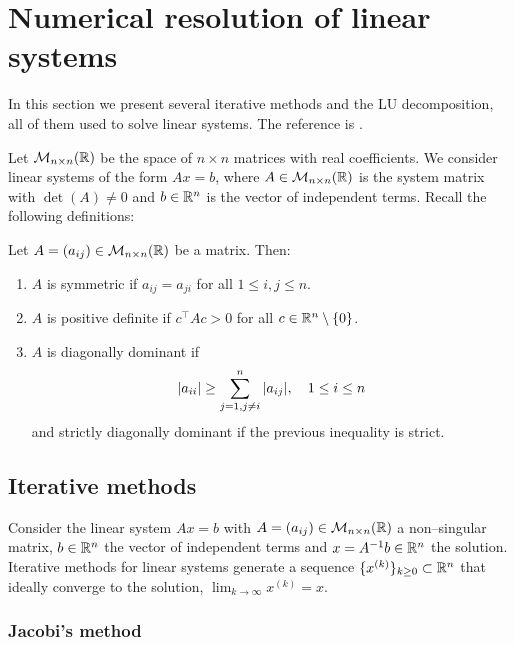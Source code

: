 
\section{Numerical resolution of linear systems} \label{ap:numerical_resolution_linear_systems}

In this section we present several iterative methods and the LU decomposition,
all of them used to solve linear systems. The reference is
\cite{golub2013matrix}.

Let $\mathcal{M}_{n \times n}(\mathbb{R})$ be the space of $n \times n$ matrices with
real coefficients. We consider linear systems of the form $A x = b$, where $A
\in \mathcal{M}_{n \times n}(\mathbb{R})$ is the system matrix with $\det(A) \neq 0$
and $b \in \mathbb{R}^n$ is the vector of independent terms. Recall the following
definitions:

\begin{definition}
    Let $A = (a_{ij}) \in \mathcal{M}_{n \times n}(\mathbb{R})$ be a matrix. Then:
    \begin{enumerate}[label={(\roman*)}, topsep=0pt]
        \item $A$ is symmetric if $a_{ij} = a_{ji}$ for all $1 \leq i, j \leq n$.
        \item $A$ is positive definite if $c^\top A c > 0$ for all $c \in \mathbb{R}^n \setminus \{ 0 \}$.
        \item $A$ is diagonally dominant if
        \begin{equation}
            \abs{a_{ii}} \geq \sum_{\substack{j = 1, j \neq i}}^n \abs{a_{ij}}, 
            \quad 1 \leq i \leq n
        \end{equation}
        and strictly diagonally dominant if the previous inequality is strict.
    \end{enumerate}
\end{definition}

\subsection{Iterative methods}

Consider the linear system $A x = b$ with $A = (a_{ij}) \in \mathcal{M}_{n
\times n}(\mathbb{R})$ a non--singular matrix, $b \in \mathbb{R}^n$ the vector of
independent terms and $x = A^{-1} b \in \mathbb{R}^n$ the solution. Iterative methods
for linear systems generate a sequence $\{ x^{(k)} \}_{k \geq 0} \subset
\mathbb{R}^n$ that ideally converge to the solution, \ie $\lim_{k \to \infty} x^{(k)}
= x$. 

\subsubsection{Jacobi's method}

